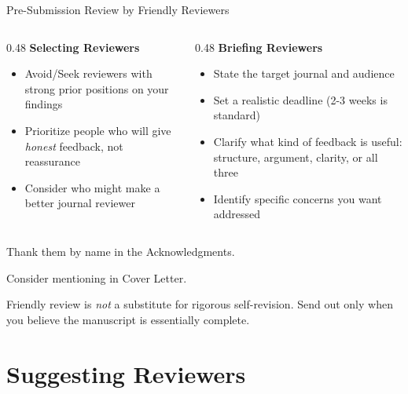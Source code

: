 \documentclass{beamer}
\begin{document}
\begin{frame}{Pre-Submission Review by Friendly Reviewers}
  \footnotesize
  \medskip
  \begin{columns}[T]
    \begin{column}{0.48\textwidth}
      \textbf{Selecting Reviewers}
      \begin{itemize}
        \item Avoid/Seek reviewers with strong prior positions on your findings
        \item Prioritize people who will give
          \emph{honest} feedback, not reassurance
        \item Consider who might make a better journal reviewer
      \end{itemize}
    \end{column}
    \begin{column}{0.48\textwidth}
      \textbf{Briefing Reviewers}
      \begin{itemize}
        \item State the target journal and audience
        \item Set a realistic deadline
          (2-3 weeks is standard)
        \item Clarify what kind of feedback is useful:
          structure, argument, clarity, or all three
        \item Identify specific concerns you want addressed
      \end{itemize}
    \end{column}
  \end{columns}

  \medskip
  Thank them by name in the Acknowledgments.

  Consider mentioning in Cover Letter.

  Friendly review is \emph{not} a substitute
  for rigorous self-revision. Send out only
  when you believe the manuscript is essentially complete.

\end{frame}

% 
\section{Suggesting Reviewers}
\end{document}
